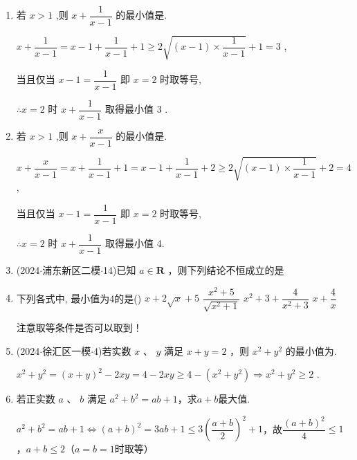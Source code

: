 \begin{enumerate}
    \item 若 $x > 1$ ,则 $x + \dfrac{1}{x - 1}$ 的最小值是.
    \begin{jieda}
        $x + \dfrac{1}{x - 1} = x - 1 + \dfrac{1}{x - 1} + 1 \geq  2\sqrt{\left( {x - 1}\right)  \times  \dfrac{1}{x - 1}} + 1 = 3$ ,
        
        当且仅当 $x - 1 = \dfrac{1}{x - 1}$ 即 $x = 2$ 时取等号,
        
        $\therefore x = 2$ 时 $x + \dfrac{1}{x - 1}$ 取得最小值 3 .
    \end{jieda}
    
    \item 若 $x > 1$ ,则 $x + \dfrac{x}{x - 1}$ 的最小值是.
    \begin{jieda}
        $x + \dfrac{x}{x - 1} = x + \dfrac{1}{x - 1} + 1 = x - 1 + \dfrac{1}{x - 1} + 2 \geq  2\sqrt{\left( {x - 1}\right)  \times  \dfrac{1}{x - 1}} + 2 = 4$ ,
        
        当且仅当 $x - 1 = \dfrac{1}{x - 1}$ 即 $x = 2$ 时取等号,
        
        $\therefore x = 2$ 时 $x + \dfrac{1}{x - 1}$ 取得最小值 4.
    \end{jieda}
    \item (2024$\cdot$浦东新区二模$\cdot$14)已知 $a \in  \mathbf{R}$ ，则下列结论不恒成立的是 


    \item 下列各式中, 最小值为4的是\dotfill()
    \xx
    {$x+2\sqrt{x}+5$}
    {$\dfrac{x^2+5}{\sqrt{x^2+1}}$}
    {$x^2+3+\dfrac{4}{x^2+3}$}
    {$x+\dfrac{4}{x}$}
    \begin{jieda}
        注意取等条件是否可以取到！
    \end{jieda}

    \item (2024$\cdot$徐汇区一模$\cdot$4)若实数 $x$ 、 $y$ 满足 $x + y = 2$ ，则 ${x}^{2} + {y}^{2}$ 的最小值为.
    \begin{jieda}
        ${x}^{2} + {y}^{2} = {\left( x + y\right) }^{2} - 2xy = 4 - 2xy \geq 4 - (x^2+y^2) \Longrightarrow  {x}^{2} + {y}^{2} \geq  2$ .
    \end{jieda}

    \item 若正实数 $a$ 、 $b$ 满足 $a^2+b^2 = ab + 1$，求$a+b$最大值.
    \begin{jieda}
        $a^2+b^2 = ab + 1 \Longleftrightarrow (a+b)^2 = 3ab + 1 \leq 3\left(\dfrac{a+b}{2}\right)^2 + 1$，故$\dfrac{(a+b)^2}{4} \leq 1$，$a+b \leq 2$（$a = b = 1$时取等）
    \end{jieda}


\end{enumerate}
